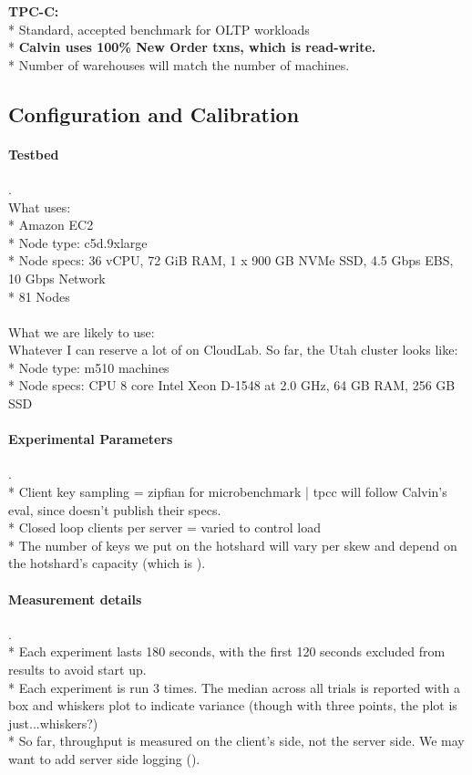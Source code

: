 \textbf{TPC-C:}\\
* Standard, accepted benchmark for OLTP workloads\\
* \textbf{Calvin uses 100\% New Order txns, which is read-write.} \\
* Number of warehouses will match the number of machines.\\

\subsection{Configuration and Calibration}

\paragraph{Testbed}.\\
What \dsdb{} uses:\\
* Amazon EC2\\
* Node type: c5d.9xlarge\\
* Node specs: 36 vCPU, 72 GiB RAM, 1 x 900 GB NVMe SSD, 4.5 Gbps EBS, 10 Gbps Network \\
* 81 Nodes\\
\\
What we are likely to use:\\
Whatever I can reserve a lot of on CloudLab. So far, the Utah cluster looks like:\\
* Node type: m510 machines\\
* Node specs: CPU 8 core Intel Xeon D-1548 at 2.0 GHz, 64 GB RAM, 256 GB SSD\\


\paragraph{Experimental Parameters}.\\
* Client key sampling = zipfian for microbenchmark | tpcc will follow Calvin's eval, since \dsdb{} doesn't publish their specs.\\
* Closed loop clients per server = varied to control load\\
* The number of keys we put on the hotshard will vary per skew and depend on the hotshard's capacity (which is ).

\paragraph{Measurement details}.\\
* Each experiment lasts 180 seconds, with the first 120 seconds excluded from results to avoid start up.\\
* Each experiment is run 3 times. The median across all trials is
reported with a box and whiskers plot to indicate variance (though with three points, the plot is just...whiskers?)\\
* So far, throughput is measured on the client's side, not the server side. We may want to add server side logging ().

